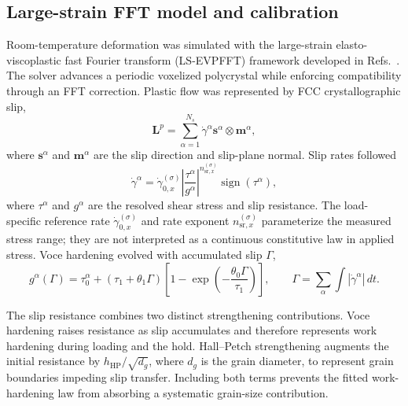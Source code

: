 \documentclass[final,12pt]{cas-sc}
\begin{document}
\subsection{Large-strain FFT model and calibration}

Room-temperature deformation was simulated with the large-strain
elasto-viscoplastic fast Fourier transform (LS-EVPFFT) framework
developed in Refs.~\cite{nagra2017efficient,ZECEVIC2022104208}. The solver
advances a periodic voxelized polycrystal while enforcing compatibility
through an FFT correction. Plastic flow was represented by FCC
crystallographic slip,
\begin{equation}
\mathbf{L}^{p}=\sum_{\alpha=1}^{N_s}
\dot{\gamma}^{\alpha}\mathbf{s}^{\alpha}\otimes\mathbf{m}^{\alpha},
\end{equation}
where $\mathbf{s}^{\alpha}$ and $\mathbf{m}^{\alpha}$ are the slip direction
and slip-plane normal. Slip rates followed
\begin{equation}
\dot{\gamma}^{\alpha}
=
\dot{\gamma}_{0,x}^{(\sigma)}
\left|\frac{\tau^{\alpha}}{g^{\alpha}}\right|^{
n_{\mathrm{sr},x}^{(\sigma)}}
\operatorname{sign}(\tau^{\alpha}),
\end{equation}
where $\tau^\alpha$ and $g^\alpha$ are the resolved shear stress and slip
resistance. The load-specific reference rate
$\dot{\gamma}_{0,x}^{(\sigma)}$ and rate exponent
$n_{\mathrm{sr},x}^{(\sigma)}$ parameterize the measured stress range; they
are not interpreted as a continuous constitutive law in applied stress.
Voce hardening evolved with accumulated slip $\Gamma$,
\begin{equation}
g^{\alpha}(\Gamma)=
\tau_0^{\alpha}+
\left(\tau_1+\theta_1\Gamma\right)
\left[1-\exp\left(-\frac{\theta_0\Gamma}{\tau_1}\right)\right],
\qquad
\Gamma=\sum_\alpha\int|\dot{\gamma}^{\alpha}|\,dt .
\end{equation}

The slip resistance combines two distinct strengthening contributions.
Voce hardening raises resistance as slip accumulates and therefore represents
work hardening during loading and the hold. Hall--Petch strengthening augments
the initial resistance by $h_{\mathrm{HP}}/\sqrt{d_g}$, where $d_g$ is the
grain diameter, to represent grain boundaries impeding slip transfer.
Including both terms prevents the fitted work-hardening law from absorbing a
systematic grain-size contribution.
\end{document}
